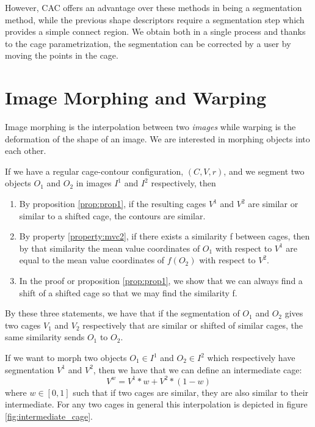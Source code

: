 However, CAC offers an advantage over these methods in being a segmentation method, while the previous shape descriptors require a segmentation step which provides a simple connect region. We obtain both in a single process and thanks to the cage parametrization, the segmentation can be corrected by a user by moving the points in the cage.

 
\section{Image Morphing and Warping}
\label{subsec:morphing_warping}


 Image morphing is the interpolation between two \textit{images} while warping is the deformation of the shape of an image. We are interested in morphing objects into each other. 
 
 If we have a regular cage-contour configuration, $(C, V, r)$, and we segment two objects $O_1$  and $O_2$ in images $I^1$ and $I^2$ respectively, then 
 
 \begin{enumerate}
 	\item By proposition \ref{prop:prop1}, if the resulting cages $V^1$ and $V^2$ are similar or similar to a shifted cage, the contours are similar.\label{point:point1}
 	\item By property \ref{property:mvc2}, if there exists a similarity f between cages, then by that similarity the mean value coordinates of $O_1$ with respect to $V^1$ are equal to the mean value coordinates of $f(O_2)$ with respect to $V^2$.
 	\item In the proof or proposition \ref{prop:prop1}, we show that we can always find a shift of a shifted cage so that we may find the similarity f.
 \end{enumerate}
 
 By these three statements, we have that if the segmentation of $O_1$ and $O_2$ gives two cages $V_1$ and $V_2$ respectively that are similar or shifted of similar cages, the same similarity sends $O_1$ to $O_2$. 
 
 If we want to morph two objects $O_1\in I^1$ and $O_2\in I^2$ which respectively have segmentation $V^1$ and $V^2$, then we have that we can define an intermediate cage:
 \begin{equation}
 V^w=V^1*w + V^2*(1-w)
 \end{equation} 
  where $w\in [0,1]$ such that if two cages are similar, they are also similar to their intermediate. For any two cages in general this interpolation is depicted in figure \ref{fig:intermediate_cage}.
  
